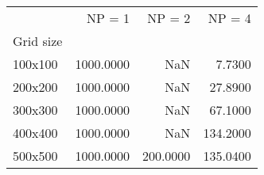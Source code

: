 \begin{tabular}{lrrr}
\toprule
{} &    NP = 1 &   NP = 2 &   NP = 4 \\
Grid size &           &          &          \\
\midrule
100x100   & 1000.0000 &      NaN &   7.7300 \\
200x200   & 1000.0000 &      NaN &  27.8900 \\
300x300   & 1000.0000 &      NaN &  67.1000 \\
400x400   & 1000.0000 &      NaN & 134.2000 \\
500x500   & 1000.0000 & 200.0000 & 135.0400 \\
\bottomrule
\end{tabular}
